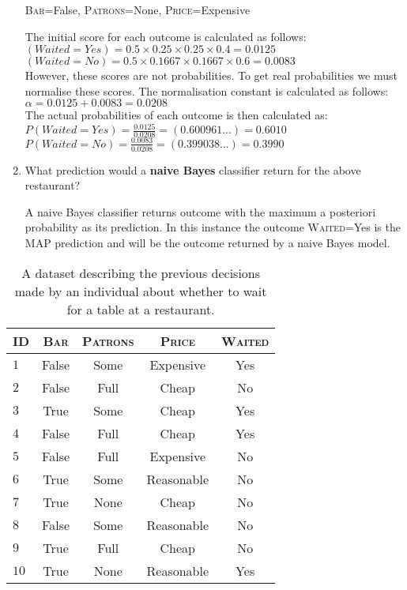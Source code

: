 \documentclass[--SOLUTION-OPTION--]{ditpaper}
\begin{document}
\begin{enumerate}
		\begin{center}
		\textsc{Bar}=False, \textsc{Patrons}=None, \textsc{Price}=Expensive
		\end{center}
		\begin{answer}
		The initial score for each outcome is calculated as follows:\\
		$(Waited=Yes) =  0.5 \times 0.25 \times 0.25 \times 0.4 = 0.0125$\\
		$(Waited=No) =  0.5 \times 0.1667 \times 0.1667 \times 0.6 = 0.0083$\\
		However, these scores are not probabilities. To get real probabilities we must normalise these scores. The normalisation constant is calculated as follows:\\
		$\alpha=0.0125+0.0083=0.0208$\\
		The actual probabilities of each outcome is then calculated as:
		$P(Waited=Yes) =  \frac{0.0125}{0.0208}=(0.600961...)=0.6010$ \\
		$P(Waited=No) =  \frac{0.0083}{0.0208}=(0.399038...)=0.3990$\\
		\end{answer}
		\item What prediction would a \textbf{naive Bayes} classifier return for the 	above restaurant?			
		\begin{answer}
		A naive Bayes classifier returns outcome with the maximum a posteriori probability as its prediction. In this instance the outcome \textsc{Waited}=Yes is the MAP prediction and will be the outcome returned by a naive Bayes model.
		\end{answer} 
\end{enumerate}
\begin{table}[h]
\begin{center}
\caption{A dataset describing the previous decisions made by an individual about whether to wait for a table at a restaurant.}
\label{tab:rest}
\vspace{0.5em}
\begin{tabular}{lcccc}
\hline
 ID & \textsc{Bar} & \textsc{Patrons} & \textsc{Price} & \textsc{Waited} \\
\hline
$1$  & False & Some & Expensive &  Yes\\
$2$    & False & Full & Cheap &   No\\
$3$    & True & Some & Cheap &   Yes\\
$4$    & False & Full & Cheap &   Yes\\
$5$    & False & Full & Expensive &   No\\
$6$    & True & Some & Reasonable &   No\\
$7$    & True & None & Cheap &   No\\
$8$    & False & Some & Reasonable &   No\\
$9$     & True & Full & Cheap &   No\\
$10$ & True & None & Reasonable &   Yes\\
\hline
\end{tabular}
\end{center}
\end{table}
\end{document}
